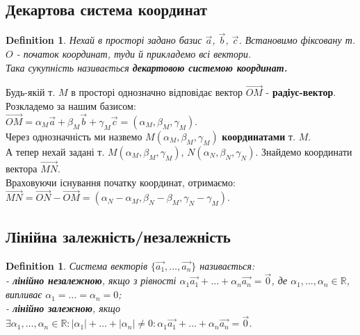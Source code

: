 \documentclass[a4paper, 10pt]{extarticle}
\theoremstyle{theoremdd}
\theoremstyle{theoremdd}
\newtheorem{definition}[theorem]{Definition}
\theoremstyle{theoremdd}
\theoremstyle{theoremdd}
\theoremstyle{theoremdd}
\theoremstyle{theoremdd}
\theoremstyle{theoremdd}
\theoremstyle{theoremdd}
\begin{document}
\subsection{Декартова система координат}
\begin{definition}
Нехай в просторі задано базис $\vec{a}$, $\vec{b}$, $\vec{c}$. Встановимо фіксовану т. $O$ - початок координат, туди й прикладемо всі вектори.\\
Така сукупність називається \textbf{декартовою системою координат.}
\begin{figure}[H]
\centering
\end{figure}
\end{definition}
Будь-якій т. $M$ в просторі однозначно відповідає вектор $\overrightarrow{OM}$ - \textbf{радіус-вектор}.\\
	Розкладемо за нашим базисом:\\
	$\overrightarrow{OM} = \alpha_M \vec{a} + \beta_M \vec{b} + \gamma_M \vec{c} = (\alpha_M, \beta_M, \gamma_M)$.\\
	Через однозначність ми назвемо $M(\alpha_M, \beta_M, \gamma_M)$ \textbf{координатами} т. $M$.
	\bigskip \\
	А тепер нехай задані т. $M(\alpha_M, \beta_M, \gamma_M)$, $N(\alpha_N, \beta_N, \gamma_N)$. Знайдемо координати вектора $\overrightarrow{MN}$.\\
	Враховуючи існування початку координат, отримаємо:\\
	$\overrightarrow{MN} = \overrightarrow{ON} - \overrightarrow{OM} = (\alpha_N - \alpha_M, \beta_N - \beta_M, \gamma_N - \gamma_M)$.
	
	
\subsection{Лінійна залежність/незалежність}
\begin{definition}
Система векторів $\{\vec{a_1}, \dots, \vec{a_n}\}$ називається:\\
	- \textbf{лінійно незалежною}, якщо з рівності $\alpha_1 \vec{a_1} + \dots + \alpha_n \vec{a_n} = \vec{0}$, де $\alpha_1, \dots, \alpha_n \in \mathbb{R}$, випливає $\alpha_1 = \dots = \alpha_n = 0$;\\
	- \textbf{лінійно залежною}, якщо $\exists \alpha_1, \dots, \alpha_n \in \mathbb{R}: |\alpha_1| + \dots + |\alpha_n| \neq 0: \alpha_1 \vec{a_1} + \dots + \alpha_n \vec{a_n} = \vec{0}$.
\end{definition}
\end{document}
